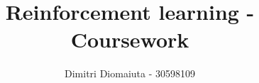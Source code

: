 \documentclass[runningheads]{llncs}
\begin{document}
%
\title{Reinforcement learning - Coursework}
%
%
\author{Dimitri Diomaiuta - 30598109}
%
%
%
\maketitle              %
%
%
%
%
\end{document}
